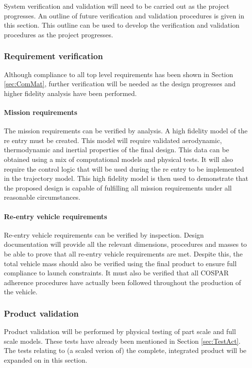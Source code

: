 System verification and validation will need to be carried out as the project progresses. An outline of future verification and validation procedures is given in this section. This outline can be used to develop the verification and validation procedures as the project progresses. 

\subsubsection{Requirement verification}
\label{sec:ReqVer}
Although compliance to all top level requirements has been shown in Section \ref{sec:ComMat}, further verification will be needed as the design progresses and higher fidelity analysis have been performed. 

\paragraph{Mission requirements}
The mission requirements can be verified by analysis. A high fidelity model of the re entry must be created. This model will require validated aerodynamic, thermodynamic and inertial properties of the final design. This data can be obtained using a mix of computational models and physical tests. It will also require the control logic that will be used during the re entry to be implemented in the trajectory model. This high fidelity model is then used to demonstrate that the proposed design is capable of fulfilling all mission requirements under all reasonable circumstances. 

\paragraph{Re-entry vehicle requirements}
Re-entry vehicle requirements can be verified by inspection. Design documentation will provide all the relevant dimensions, procedures and masses to be able to prove that all re-entry vehicle requirements are met. Despite this, the total vehicle mass should also be verified using the final product to ensure full compliance to launch constraints. It must also be verified that all COSPAR adherence procedures have actually been followed throughout the production of the vehicle. 

\subsubsection{Product validation}
Product validation will be performed by physical testing of part scale and full scale models. These tests have already been mentioned in Section \ref{sec:TestAct}. The tests relating to (a scaled verion of) the complete, integrated product will be expanded on in this section.  

